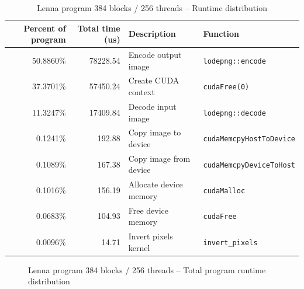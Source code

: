 \begin{enumerate}
\begin{table}
\begin{tabular}{rrll}
Percent of program & Total time (us) & Description            & Function \\
\hline
50.8860\%          &  78228.54       & Encode output image    & \texttt{lodepng::encode} \\
37.3701\%          &  57450.24       & Create CUDA context    & \texttt{cudaFree(0)} \\
11.3247\%          &  17409.84       & Decode input image     & \texttt{lodepng::decode} \\
 0.1241\%          &    192.88       & Copy image to device   & \texttt{cudaMemcpyHostToDevice} \\
 0.1089\%          &    167.38       & Copy image from device & \texttt{cudaMemcpyDeviceToHost} \\
 0.1016\%          &    156.19       & Allocate device memory & \texttt{cudaMalloc} \\
 0.0683\%          &    104.93       & Free device memory     & \texttt{cudaFree} \\
 0.0096\%          &     14.71       & Invert pixels kernel   & \texttt{invert\_pixels} \\
\end{tabular}
\caption{Lenna program 384 blocks / 256 threads -- Runtime distribution}
\label{table:lenna_runtime_distribution}
\end{table}

\begin{figure}
\def\angle{0}
\def\radius{3}
\def\cyclelist{{"orange","blue","red","green","purple","yellow"}}
\newcount\cyclecount {}
\newcount\ind {}
\caption{Lenna program 384 blocks / 256 threads -- Total program runtime distribution}
\label{figure:lenna_total_pie}
\end{figure}


\end{enumerate}
